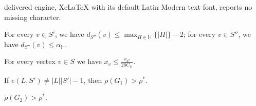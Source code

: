 \documentclass[10pt,a4paper]{amsart}
\begin{document}
delivered engine, XeLaTeX with its default Latin Modern text font, reports no missing character.
\begin{lemma}\label{lem3.1}
      For every $v\in S'$, %
    we have $d_{S''}(v)\leq \max_{H\in \mathbb{H}}\{|H|\}-2$; for every $v\in S''$, we have $d_{S''}(v)\leq\alpha_{\mathbb{H}}$.
\end{lemma}

\begin{lemma}\label{lem3.2}
    For every vertex  $v\in S$ we have $x_v\leq\frac{x_{u^*}}{20C_\mathbb{H}}$.
\end{lemma}

\begin{claim}\label{lem3.4}
If $e(L,S')\neq |L||S'|-1$, then $\rho(G_1)>\rho^*$.
\end{claim}

\begin{claim}\label{lem3.5}
 $\rho(G_2)>\rho^*$. 
\end{claim}
\end{document}
